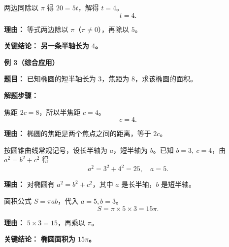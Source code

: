 \begin{examplebox}
\begin{description}[style=nextline, leftmargin=2.8em, labelsep=0.5em, itemsep=0.45em]
    \item[\textbf{第三步（解方程）：}] 两边同除以 $\pi$ 得 $20=5t$，解得 $t=4$。
    \[
    t = 4.
    \]
    \par\textbf{理由：} 等式两边除以 $\pi$（$\pi\neq0$），再除以 $5$。
\end{description}

\textbf{\textcolor{CExample}{关键结论：}} \textbf{另一条半轴长为 $4$。}

\medskip
\textbf{\textcolor{CExample}{例 3（综合应用）}}

\textbf{\textcolor{CExample}{题目：}} 已知椭圆的短半轴长为 $3$，焦距为 $8$，求该椭圆的面积。

\textbf{\textcolor{CExample}{解题步骤：}}
\begin{description}[style=nextline, leftmargin=2.8em, labelsep=0.5em, itemsep=0.45em]
    \item[\textbf{第一步（求半焦距）：}] 焦距 $2c=8$，所以半焦距 $c=4$。
    \[
    c = 4.
    \]
    \par\textbf{理由：} 椭圆的焦距是两个焦点之间的距离，等于 $2c$。

    \item[\textbf{第二步（求长半轴）：}] 按圆锥曲线常规记号，设长半轴为 $a$，短半轴为 $b$。已知 $b=3,\ c=4$，由 $a^2=b^2+c^2$ 得
    \[
    a^2 = 3^2 + 4^2 = 25,\quad a=5.
    \]
    \par\textbf{理由：} 对椭圆有 $a^2=b^2+c^2$，其中 $a$ 是长半轴，$b$ 是短半轴。

    \item[\textbf{第三步（计算面积）：}] 面积公式 $S=\pi ab$，代入 $a=5,
    b=3$。
    \[
    S = \pi \times 5 \times 3 = 15\pi.
    \]
    \par\textbf{理由：} $5\times3=15$，再乘以 $\pi$。
\end{description}

\textbf{\textcolor{CExample}{关键结论：}} \textbf{椭圆面积为 $15\pi$。}
\end{examplebox}